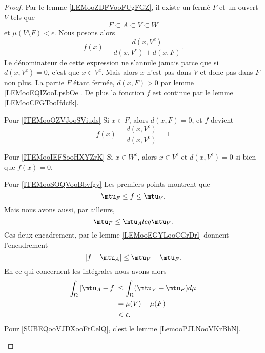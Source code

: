 \begin{proof}
    Par le lemme \ref{LEMooZDFVooFUgFGZ}, il existe un fermé \( F\) et un ouvert \( V\) tels que
    \begin{equation}
        F\subset A\subset V\subset W
    \end{equation}
    et \( \mu(V\setminus F)<\epsilon\). Nous posons alors
    \begin{equation}
        f(x)=\frac{ d(x,V^c) }{ d(x,V^c)+d(x,F) }.
    \end{equation}
    Le dénominateur de cette expression ne s'annule jamais parce que si \( d(x,V^c)=0\), c'est que \( x\in V^c\). Mais alors \( x\) n'est pas dans \( V\) et donc pas dans \( F\) non plus. La partie \( F\) étant fermée, \( d(x,F)>0\) par lemme \ref{LEMooEQIZooLpsbOe}. De plus la fonction \( f\) est continue par le lemme \ref{LEMooCFGTooIfdcfk}.

    \begin{subproof}
    \item[Pour \ref{ITEMooOZVJooSViuds}]
        Si \( x\in F\), alors \( d(x,F)=0\), et \( f\) devient
        \begin{equation}
            f(x)=\frac{ d(x,V^c) }{ d(x,V^c) }=1
        \end{equation}
    \item[Pour \ref{ITEMooIEFSooHXYZrK}]
        Si \( x\in W^c\), alors \( x\in V^c\) et \( d(x,V^c)=0\) si bien que \( f(x)=0\). 
    \item[Pour \ref{ITEMooSOQVooBbvfgy}]
        Les premiers points montrent que
        \begin{equation}
            \mtu_F\leq f\leq \mtu_V.
        \end{equation}
        Mais nous avons aussi, par ailleurs,
        \begin{equation}
            \mtu_{F}\leq \mtu_Aleq \mtu_V.
        \end{equation}
        Ces deux encadrement, par le lemme \ref{LEMooEGYLooCGrDrl} donnent l'encadrement
        \begin{equation}
            | f-\mtu_A |\leq \mtu_V-\mtu_F.
        \end{equation}
        En ce qui concernent les intégrales nous avons alors
        \begin{subequations}
            \begin{align}
                \int_{\Omega}| \mtu_A-f |&\leq \int_{\Omega}(\mtu_V-\mtu_F)d\mu\\
                &=\mu(V)-\mu(F) \label{SUBEQooVJDXooFtCelQ}\\
                &<\epsilon.
            \end{align}
        \end{subequations}
        Pour \eqref{SUBEQooVJDXooFtCelQ}, c'est le lemme \ref{LemooPJLNooVKrBhN}.
    \end{subproof}
\end{proof}

